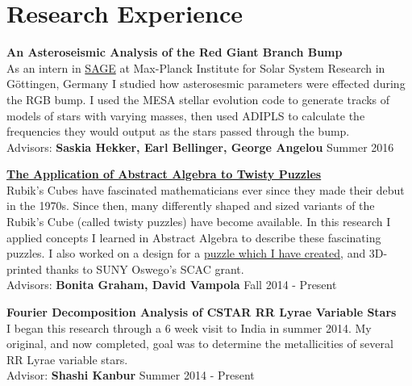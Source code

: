 \documentclass[8pt]{article}
\renewenvironment{itemize}{
  \begin{list}{}{
    \setlength{\leftmargin}{1.5em}
  }
}{
  \end{list}
}
\begin{document}
 
 



\section*{Research Experience}
\begin{itemize}

\item \textbf{An Asteroseismic Analysis of the Red Giant Branch Bump}\\
As an intern in \href{http://www.mps.mpg.de/sage}{SAGE} at Max-Planck Institute for Solar System Research in G{\"o}ttingen, Germany I studied how asterosesmic parameters were effected during the RGB bump. I used the MESA
stellar evolution code to generate tracks of models of stars with varying masses, then used ADIPLS to calculate the frequencies they would output as the stars passed through the
bump.\\
Advisors: \textbf{Saskia Hekker, Earl Bellinger, George Angelou} \hfill Summer 2016

\item \href{https://kroffo.github.io/docs/thesis.pdf}{\textbf{The Application of Abstract Algebra to Twisty Puzzles}}\\
Rubik's Cubes have fascinated mathematicians ever since they made their debut in the 1970s. Since then, many differently shaped and sized variants of the Rubik's Cube (called twisty puzzles) have become available. In this research I applied concepts I learned in Abstract Algebra to describe these fascinating puzzles. I also worked on a design for a \href{https://www.youtube.com/watch?v=17ll6TWm45M}{puzzle which I have created}, and 3D-printed thanks to SUNY Oswego's SCAC grant.\\
Advisors: \textbf{Bonita Graham, David Vampola} \hfill Fall 2014 - Present

\item \textbf{Fourier Decomposition Analysis of CSTAR RR Lyrae Variable Stars}\\
I began this research through a 6 week visit to India in summer 2014. My original, and now completed, goal was to determine the metallicities of several RR Lyrae variable stars.\\
Advisor: \textbf{Shashi Kanbur} \hfill Summer 2014 - Present

\end{itemize}
\end{document}
